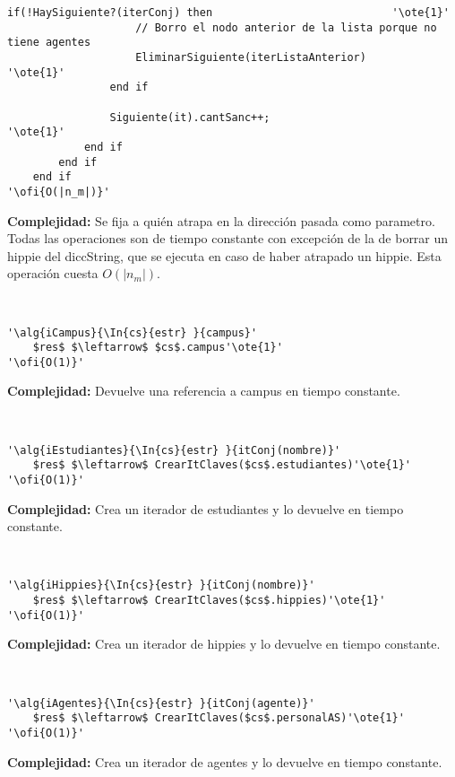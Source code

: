 \begin{lstlisting}[mathescape]
	   			if(!HaySiguiente?(iterConj) then							'\ote{1}'
	   				// Borro el nodo anterior de la lista porque no tiene agentes
	   				EliminarSiguiente(iterListaAnterior)					'\ote{1}'
	   			end if

	   			Siguiente(it).cantSanc++;											'\ote{1}'
	   		end if
	   	end if
	end if
'\ofi{O(|n_m|)}'
\end{lstlisting}

\textbf{Complejidad:} Se fija a quién atrapa en la dirección pasada como parametro. Todas las operaciones son de tiempo constante con excepción de la de borrar un hippie del diccString, que se ejecuta en caso de haber atrapado un hippie. Esta operación cuesta $O(|n_m|)$.

~


\begin{lstlisting}[mathescape]
'\alg{iCampus}{\In{cs}{estr} }{campus}'
	$res$ $\leftarrow$ $cs$.campus'\ote{1}'
'\ofi{O(1)}'
\end{lstlisting}

\textbf{Complejidad:} Devuelve una referencia a campus en tiempo constante.

~


\begin{lstlisting}[mathescape]
'\alg{iEstudiantes}{\In{cs}{estr} }{itConj(nombre)}'
	$res$ $\leftarrow$ CrearItClaves($cs$.estudiantes)'\ote{1}'
'\ofi{O(1)}'
\end{lstlisting}

\textbf{Complejidad:} Crea un iterador de estudiantes y lo devuelve en tiempo constante.

~


\begin{lstlisting}[mathescape]
'\alg{iHippies}{\In{cs}{estr} }{itConj(nombre)}'
	$res$ $\leftarrow$ CrearItClaves($cs$.hippies)'\ote{1}'
'\ofi{O(1)}'
\end{lstlisting}

\textbf{Complejidad:} Crea un iterador de hippies y lo devuelve en tiempo constante.

~


\begin{lstlisting}[mathescape]
'\alg{iAgentes}{\In{cs}{estr} }{itConj(agente)}'
	$res$ $\leftarrow$ CrearItClaves($cs$.personalAS)'\ote{1}'
'\ofi{O(1)}'
\end{lstlisting}

\textbf{Complejidad:} Crea un iterador de agentes y lo devuelve en tiempo constante.

~


